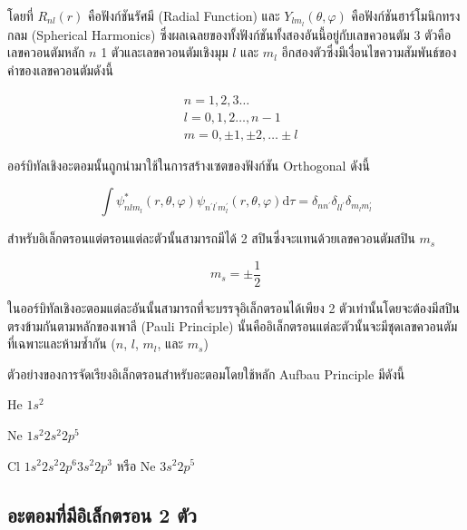 \noindent โดยที่ $R_{nl}(r)$ คือฟังก์ชันรัศมี (Radial Function) และ $Y_{lm_{l}}(\theta, \varphi)$ คือฟังก์ชันฮาร์โมนิกทรงกลม 
(Spherical Harmonics) ซึ่งผลเฉลยของทั้งฟังก์ชันทั้งสองอันนี้อยู่กับเลขควอนตัม 3 ตัวคือเลขควอนตัมหลัก $n$ 1 ตัวและเลขควอนตัมเชิงมุม
$l$ และ $m_{l}$ อีกสองตัวซึ่งมีเงื่อนไขความสัมพันธ์ของค่าของเลขควอนตัมดังนี้

\begin{equation*}
    \begin{aligned}
        & n=1,2,3 \ldots \\
        & l=0,1,2 \ldots, n-1 \\
        & m=0, \pm 1, \pm 2, \ldots \pm l
    \end{aligned}
\end{equation*}

ออร์บิทัลเชิงอะตอมนั้นถูกนำมาใช้ในการสร้างเซตของฟังก์ชัน Orthogonal ดังนี้

\begin{equation}
    \int \psi_{nlm_{l}}^{*} (r, \theta, \varphi) 
        \psi_{n^{\prime} l^{\prime} m^{\prime}_{l}} (r, \theta, \varphi) 
        \mathrm{d} \tau 
    = \delta_{n n^{\prime}} 
        \delta_{l l^{\prime}} 
        \delta_{m_{l} m_{l}^{\prime}}
\end{equation}

\noindent สำหรับอิเล็กตรอนแต่ตรอนแต่ละตัวนั้นสามารถมีได้ 2 สปินซึ่งจะแทนด้วยเลขควอนตัมสปิน $m_{s}$

\begin{equation}
    m_{s} = \pm \frac{1}{2}
\end{equation}

ในออร์บิทัลเชิงอะตอมแต่ละอันนั้นสามารถที่จะบรรจุอิเล็กตรอนได้เพียง 2 ตัวเท่านั้นโดยจะต้องมีสปินตรงข้ามกันตามหลักของเพาลี (Pauli Principle)
นั้นคืออิเล็กตรอนแต่ละตัวนั้นจะมีชุดเลขควอนตัมที่เฉพาะและห้ามซ้ำกัน ($n$, $l$, $m_{l}$, และ $m_{s}$)

ตัวอย่างของการจัดเรียงอิเล็กตรอนสำหรับอะตอมโดยใช้หลัก Aufbau Principle มีดังนี้

He $1s^{2}$

Ne $1s^{2} 2s^{2} 2p^{5}$

Cl $1s^{2} 2s^{2} 2p^{6} 3s^{2} 2p^{3}$ หรือ Ne $3s^{2} 2p^{5}$

\subsection{อะตอมที่มีอิเล็กตรอน 2 ตัว}

